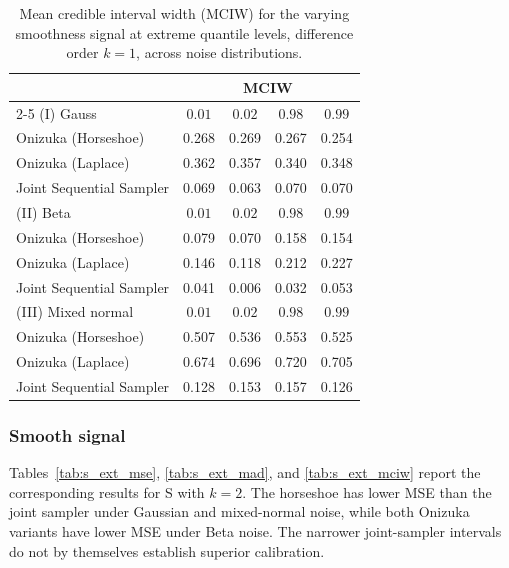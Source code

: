 \begin{table}[htbp]
\centering
\caption{Mean credible interval width (MCIW) for the varying smoothness signal at extreme quantile levels, difference order $k = 1$, across noise distributions.}
\label{tab:vs_ext_mciw}
\begin{tabular}{lcccc}
\toprule
& \multicolumn{4}{c}{MCIW} \\
\cmidrule(lr){2-5}
(I) Gauss & $0.01$ & $0.02$ & $0.98$ & $0.99$ \\
\midrule
Onizuka (Horseshoe)      & 0.268 & 0.269 & 0.267 & 0.254 \\
Onizuka (Laplace)        & 0.362 & 0.357 & 0.340 & 0.348 \\
Joint Sequential Sampler & 0.069 & 0.063 & 0.070 & 0.070 \\
\midrule
(II) Beta & $0.01$ & $0.02$ & $0.98$ & $0.99$ \\
\midrule
Onizuka (Horseshoe)      & 0.079 & 0.070 & 0.158 & 0.154 \\
Onizuka (Laplace)        & 0.146 & 0.118 & 0.212 & 0.227 \\
Joint Sequential Sampler & 0.041 & 0.006 & 0.032 & 0.053 \\
\midrule
(III) Mixed normal & $0.01$ & $0.02$ & $0.98$ & $0.99$ \\
\midrule
Onizuka (Horseshoe)      & 0.507 & 0.536 & 0.553 & 0.525 \\
Onizuka (Laplace)        & 0.674 & 0.696 & 0.720 & 0.705 \\
Joint Sequential Sampler & 0.128 & 0.153 & 0.157 & 0.126 \\
\bottomrule
\end{tabular}
\end{table}

\clearpage
\subsubsection{Smooth signal}
\label{app:sim:joint:smooth}
Tables~\ref{tab:s_ext_mse}, \ref{tab:s_ext_mad}, and \ref{tab:s_ext_mciw} report the corresponding results for S with $k=2$. The horseshoe has lower MSE than the joint sampler under Gaussian and mixed-normal noise, while both Onizuka variants have lower MSE under Beta noise. The narrower joint-sampler intervals do not by themselves establish superior calibration.

